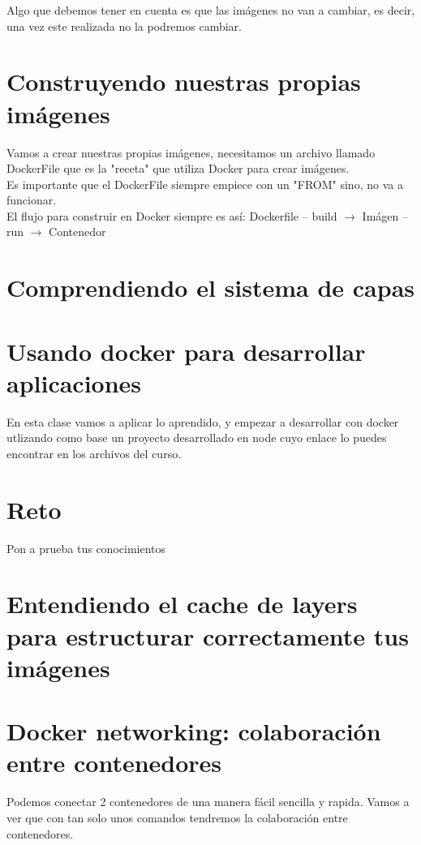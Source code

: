\documentclass{article}
\begin{document}
Algo que debemos tener en cuenta es que las imágenes no van a cambiar, es
decir, una vez este realizada no la podremos cambiar.\\


\section{Construyendo nuestras propias imágenes}%
Vamos a crear nuestras propias imágenes, necesitamos un archivo llamado
DockerFile que es la "receta" que utiliza Docker para crear imágenes.\\

Es importante que el DockerFile siempre empiece con un "FROM" sino, no va a
funcionar.\\

El flujo para construir en Docker siempre es así:
Dockerfile $–$ build $\rightarrow$ Imágen $–$ run $\rightarrow$ Contenedor


\section{Comprendiendo el sistema de capas}%


\section{Usando docker para desarrollar aplicaciones}%
En esta clase vamos a aplicar lo aprendido, y empezar a desarrollar con docker
utlizando como base un proyecto desarrollado en node cuyo enlace lo puedes
encontrar en los archivos del curso.\\

\section{Reto}%
Pon a prueba tus conocimientos


\section{Entendiendo el cache de layers para estructurar correctamente tus imágenes}%

\section{Docker networking: colaboración entre contenedores}%
Podemos conectar 2 contenedores de una manera fácil sencilla y rapida. Vamos a
ver que con tan solo unos comandos tendremos la colaboración entre contenedores.\\
\end{document}
